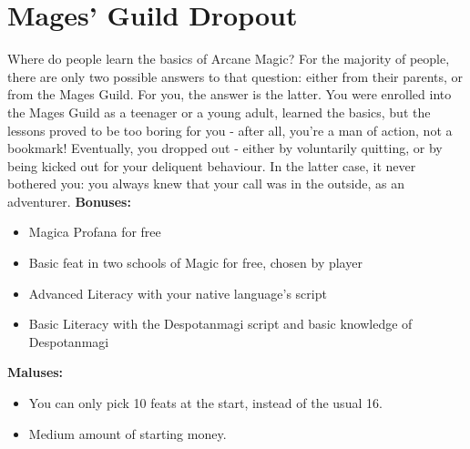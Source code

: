 \section{Mages' Guild Dropout}
Where do people learn the basics of Arcane Magic? For the majority of people, there are only two possible answers to that question: either from their parents, or from the Mages Guild. For you, the answer is the latter. You were enrolled into the Mages Guild as a teenager or a young adult, learned the basics, but the lessons proved to be too boring for you - after all, you're a man of action, not a bookmark! Eventually, you dropped out - either by voluntarily quitting, or by being kicked out for your deliquent behaviour. In the latter case, it never bothered you: you always knew that your call was in the outside, as an adventurer. \newline
\textbf{Bonuses:}
\begin{itemize}
	\item Magica Profana for free
	\item Basic feat in two schools of Magic for free, chosen by player
	\item Advanced Literacy with your native language's script
	\item Basic Literacy with the Despotanmagi script and basic knowledge of Despotanmagi 
\end{itemize}
\textbf{Maluses:}
\begin{itemize}
	\item You can only pick 10 feats at the start, instead of the usual 16.
	\item Medium amount of starting money.
\end{itemize}
